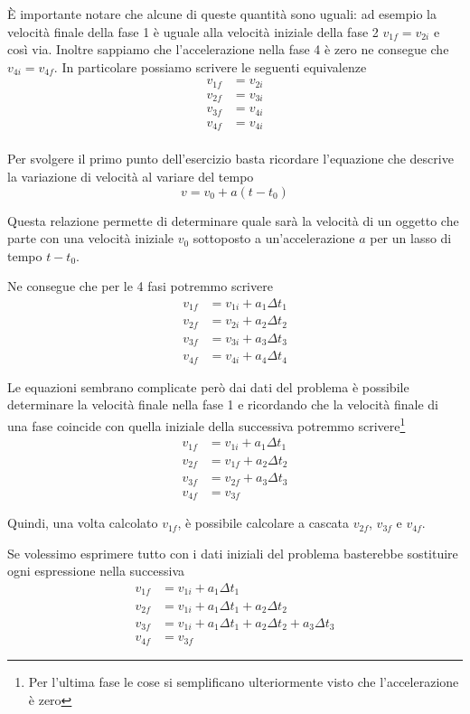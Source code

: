 \documentclass{article}
\begin{document}
È importante notare che alcune di queste quantità sono uguali: ad esempio la velocità finale della fase 1 è uguale alla velocità iniziale della fase 2 $v_{1f}=v_{2i}$ e così via. Inoltre sappiamo che l'accelerazione nella fase 4 è zero ne consegue che $v_{4i}=v_{4f}$.
In particolare possiamo scrivere le seguenti equivalenze
\begin{align}
  v_{1f} &= v_{2i} \\
  v_{2f} &= v_{3i} \\
  v_{3f} &= v_{4i} \\
  v_{4f} &= v_{4i} \\
\end{align}

Per svolgere il primo punto dell'esercizio basta ricordare l'equazione che descrive la variazione di velocità al variare del tempo
\begin{equation}
  v = v_0 + a (t-t_0)
\end{equation}

Questa relazione permette di determinare quale sarà la velocità di un oggetto che parte con una velocità iniziale $v_0$ sottoposto a un'accelerazione $a$ per un lasso di tempo $t-t_0$.

Ne consegue che per le 4 fasi potremmo scrivere
\begin{align}
  v_{1f} &= v_{1i} + a_1 \Delta t_1 \\
  v_{2f} &= v_{2i} + a_2 \Delta t_2 \\
  v_{3f} &= v_{3i} + a_3 \Delta t_3 \\
  v_{4f} &= v_{4i} + a_4 \Delta t_4
\end{align}

Le equazioni sembrano complicate però dai dati del problema è possibile determinare la velocità finale nella fase 1 e ricordando che la velocità finale di una fase coincide con quella iniziale della successiva potremmo scrivere\footnote{Per l'ultima fase le cose si semplificano ulteriormente visto che l'accelerazione è zero}
\begin{align}
  v_{1f} &= v_{1i} + a_1 \Delta t_1 \\
  v_{2f} &= v_{1f} + a_2 \Delta t_2 \\
  v_{3f} &= v_{2f} + a_3 \Delta t_3 \\
  v_{4f} &= v_{3f}
\end{align}

Quindi, una volta calcolato $v_{1f}$, è possibile calcolare a cascata $v_{2f}$, $v_{3f}$ e $v_{4f}$. 

Se volessimo esprimere tutto con i dati iniziali del problema basterebbe sostituire ogni espressione nella successiva
\begin{align}
  v_{1f} &= v_{1i} + a_1 \Delta t_1 \\
  v_{2f} &= v_{1i} + a_1 \Delta t_1 + a_2 \Delta t_2 \\
  v_{3f} &= v_{1i} + a_1 \Delta t_1 + a_2 \Delta t_2 + a_3 \Delta t_3 \\
  v_{4f} &= v_{3f}
\end{align}
\end{document}
